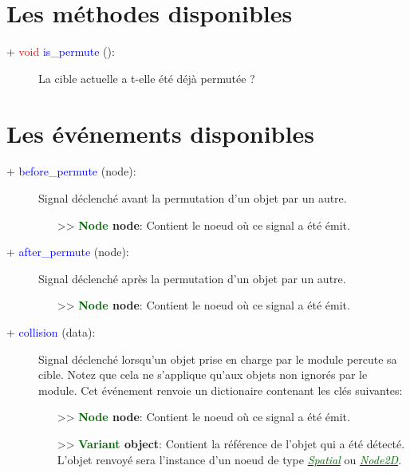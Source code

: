 \documentclass[a4paper, 11pt]{article}
\begin{document}
	\section{Les méthodes disponibles}
	\begin{description}
		\item [+ \textcolor{red}{void} \textcolor{blue}{is\_permute} ():] La cible actuelle a t-elle été 
		déjà permutée ?
	\end{description}

	\section{Les événements disponibles}
	\begin{description}
		\item [+ \textcolor{blue}{before\_permute} (node):] Signal déclenché avant la permutation d'un objet
		par un autre.
		\begin{itemize}
			\item [>> \textbf{\textcolor{darkgreen}{Node} node}:] Contient le noeud où ce signal a été émit.
			\\
		\end{itemize}
	\end{description}
	\begin{description}
		\item [+ \textcolor{blue}{after\_permute} (node):] Signal déclenché après la permutation d'un objet
		par un autre.
		\begin{itemize}
			\item [>> \textbf{\textcolor{darkgreen}{Node} node}:] Contient le noeud où ce signal a été émit.
			\\
		\end{itemize}
	\end{description}
	\begin{description}
		\item [+ \textcolor{blue}{collision} (data):] Signal déclenché lorsqu'un objet prise en charge par 
		le module percute sa cible. Notez que cela ne s'applique qu'aux objets non ignorés par le module. 
		Cet événement renvoie un dictionaire contenant les clés suivantes:
		\begin{itemize}
			\item [>> \textbf{\textcolor{darkgreen}{Node} node}:] Contient le noeud où ce signal a été émit.
			\item [>> \textbf{\textcolor{darkgreen}{Variant} object}:] Contient la référence de l'objet qui 
			a été détecté. L'objet renvoyé sera l'instance d'un noeud de type
			\href{https://docs.godotengine.org/en/stable/classes/class_spatial.html}
			{\textit{\textcolor{darkgreen}{Spatial}}} ou
			\href{https://docs.godotengine.org/en/stable/classes/class_node2d.html}
			{\textit{\textcolor{darkgreen}{Node2D}}}.
		\end{itemize}
	\end{description}
\end{document}
